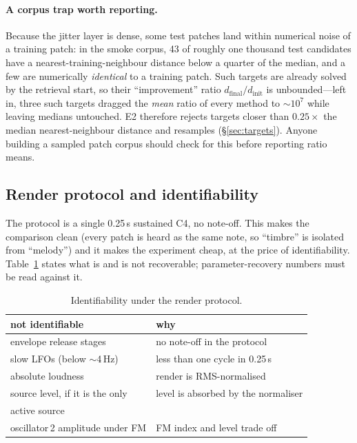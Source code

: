 \documentclass[11pt]{article}
\newcommand{\nDrop}{43}
\begin{document}
\paragraph{A corpus trap worth reporting.} Because the jitter layer is dense,
some test patches land within numerical noise of a training patch: in the smoke
corpus, \nDrop{} of roughly one thousand test candidates have a
nearest-training-neighbour distance below a quarter of the median, and a few are
numerically \emph{identical} to a training patch. Such targets are already
solved by the retrieval start, so their ``improvement'' ratio
$d_{\text{final}}/d_{\text{init}}$ is unbounded---left in, three such targets
dragged the \emph{mean} ratio of every method to $\sim 10^{7}$ while leaving
medians untouched. E2 therefore rejects targets closer than
$0.25\times$ the median nearest-neighbour distance and resamples
(\S\ref{sec:targets}). Anyone building a sampled patch corpus should check for
this before reporting ratio means.

\subsection{Render protocol and identifiability}\label{sec:identifiability}

The protocol is a single 0.25\,s sustained C4, no note-off. This makes the
comparison clean (every patch is heard as the same note, so ``timbre'' is
isolated from ``melody'') and it makes the experiment cheap, at the price of
identifiability. Table~\ref{tab:ident} states what is and is not recoverable;
parameter-recovery numbers must be read against it.

\begin{table}[t]
\centering\small
\caption{Identifiability under the render protocol.}
\label{tab:ident}
\begin{tabular}{p{5.1cm}p{9.6cm}}
\toprule
not identifiable & why \\
\midrule
envelope release stages & no note-off in the protocol \\
slow LFOs (below $\sim$4\,Hz) & less than one cycle in 0.25\,s \\
absolute loudness & render is RMS-normalised \\
source level, if it is the only & level is absorbed by the normaliser \\
\quad active source & \\
oscillator\,2 amplitude under FM & FM index and level trade off \\
\bottomrule
\end{tabular}
\end{table}
\end{document}
